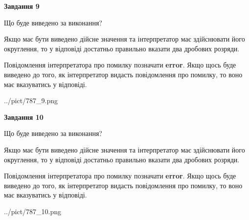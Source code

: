 \documentclass[12pt, ukrainian]{article}
\begin{document}
{\begin {Large}
{\begin {center}\textbf{Завдання 9}\end {center}}\par
Що буде виведено за виконання? \par

Якщо має бути виведено дійсне значення та інтерпретатор має здійснювати його округлення, 
то у відповіді достатньо правильно вказати два дробових розряди.

Повідомлення інтерпретатора про помилку позначати \textbf{error}.
Якщо щось буде виведено до того, як інтерпретатор видасть повідомлення про помилку, 
то воно має вказуватись у відповіді. \par

\begin{center}
	{../pict/787_9.png}
\end{center}
\newpage

{\begin {center}\textbf{Завдання 10}\end {center}}\par
Що буде виведено за виконання? \par

Якщо має бути виведено дійсне значення та інтерпретатор має здійснювати його округлення, 
то у відповіді достатньо правильно вказати два дробових розряди.

Повідомлення інтерпретатора про помилку позначати \textbf{error}.
Якщо щось буде виведено до того, як інтерпретатор видасть повідомлення про помилку, 
то воно має вказуватись у відповіді. \par

\begin{center}
	{../pict/787_10.png}
\end{center}
\newpage

\end {Large}}
\end{document}
